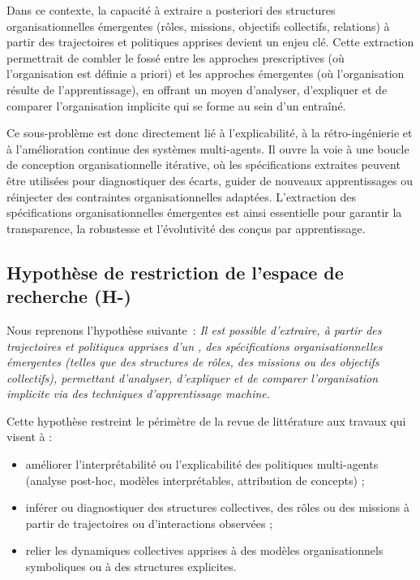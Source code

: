 Dans ce contexte, la capacité à extraire a posteriori des structures organisationnelles émergentes (rôles, missions, objectifs collectifs, relations) à partir des trajectoires et politiques apprises devient un enjeu clé. Cette extraction permettrait de combler le fossé entre les approches prescriptives (où l’organisation est définie a priori) et les approches émergentes (où l’organisation résulte de l’apprentissage), en offrant un moyen d’analyser, d’expliquer et de comparer l’organisation implicite qui se forme au sein d’un  entraîné.

Ce sous-problème est donc directement lié à l’explicabilité, à la rétro-ingénierie et à l’amélioration continue des systèmes multi-agents. Il ouvre la voie à une boucle de conception organisationnelle itérative, où les spécifications extraites peuvent être utilisées pour diagnostiquer des écarts, guider de nouveaux apprentissages ou réinjecter des contraintes organisationnelles adaptées. L’extraction des spécifications organisationnelles émergentes est ainsi essentielle pour garantir la transparence, la robustesse et l’évolutivité des  conçus par apprentissage.

\subsection*{Hypothèse de restriction de l’espace de recherche (H-)}

Nous reprenons l’hypothèse suivante~: \textit{Il est possible d’extraire, à partir des trajectoires et politiques apprises d’un , des spécifications organisationnelles émergentes (telles que des structures de rôles, des missions ou des objectifs collectifs), permettant d’analyser, d’expliquer et de comparer l’organisation implicite via des techniques d'apprentissage machine.}

Cette hypothèse restreint le périmètre de la revue de littérature aux travaux qui visent à :
\begin{itemize}
  \item améliorer l’interprétabilité ou l’explicabilité des politiques multi-agents (analyse post-hoc, modèles interprétables, attribution de concepts) ;
  \item inférer ou diagnostiquer des structures collectives, des rôles ou des missions à partir de trajectoires ou d’interactions observées ;
  \item relier les dynamiques collectives apprises à des modèles organisationnels symboliques ou à des structures explicites.
\end{itemize}

